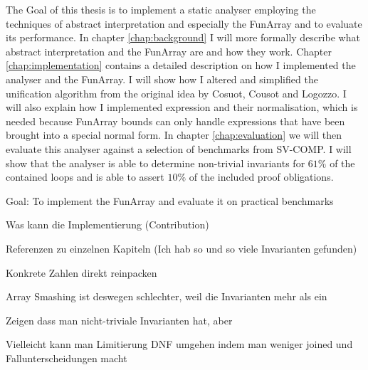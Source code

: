 The Goal of this thesis is to implement a static analyser employing the techniques of abstract interpretation and especially the FunArray and to evaluate its performance. In chapter \ref{chap:background} I will more formally describe what abstract interpretation and the FunArray are and how they work. Chapter \ref{chap:implementation} contains a detailed description on how I implemented the analyser and the FunArray. I will show how I altered and simplified the unification algorithm from the original idea by Cosuot, Cousot and Logozzo. I will also explain how I implemented expression and their normalisation, which is needed because FunArray bounds can only handle expressions that have been brought into a special normal form. In chapter \ref{chap:evaluation} we will then evaluate this analyser against a selection of benchmarks from SV-COMP. I will show that the analyser is able to determine non-trivial invariants for $61\%$ of the contained loops and is able to assert $10\%$ of the included proof obligations.


\color{red}

Goal: To implement the FunArray and evaluate it on practical benchmarks

Was kann die Implementierung (Contribution)

Referenzen zu einzelnen Kapiteln (Ich hab so und so viele Invarianten gefunden)

Konkrete Zahlen direkt reinpacken


Array Smashing ist deswegen schlechter, weil die Invarianten mehr als ein

Zeigen dass man nicht-triviale Invarianten hat, aber 


Vielleicht kann man Limitierung DNF umgehen indem man weniger joined und Fallunterscheidungen macht

\color{black}



















 